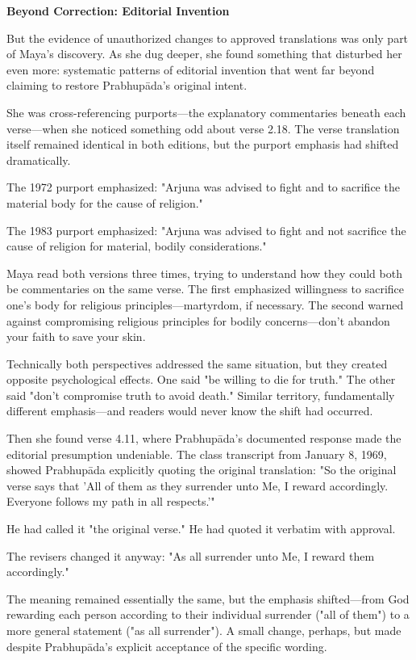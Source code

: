 \documentclass[12pt,twoside]{book}
\begin{document}
\vspace{0.5cm}
\textbf{Beyond Correction: Editorial Invention}
\vspace{0.2cm}


But the evidence of unauthorized changes to approved translations was only part of Maya's discovery. As she dug deeper, she found something that disturbed her even more: systematic patterns of editorial invention that went far beyond claiming to restore Prabhupāda's original intent.

She was cross-referencing purports—the explanatory commentaries beneath each verse—when she noticed something odd about verse 2.18. The verse translation itself remained identical in both editions, but the purport emphasis had shifted dramatically.

The 1972 purport emphasized: "Arjuna was advised to fight and to sacrifice the material body for the cause of religion."

The 1983 purport emphasized: "Arjuna was advised to fight and not sacrifice the cause of religion for material, bodily considerations."

Maya read both versions three times, trying to understand how they could both be commentaries on the same verse. The first emphasized willingness to sacrifice one's body for religious principles—martyrdom, if necessary. The second warned against compromising religious principles for bodily concerns—don't abandon your faith to save your skin.

Technically both perspectives addressed the same situation, but they created opposite psychological effects. One said "be willing to die for truth." The other said "don't compromise truth to avoid death." Similar territory, fundamentally different emphasis—and readers would never know the shift had occurred.

Then she found verse 4.11, where Prabhupāda's documented response made the editorial presumption undeniable. The class transcript from January 8, 1969, showed Prabhupāda explicitly quoting the original translation: "So the original verse says that 'All of them as they surrender unto Me, I reward accordingly. Everyone follows my path in all respects.'"

He had called it "the original verse." He had quoted it verbatim with approval.

The revisers changed it anyway: "As all surrender unto Me, I reward them accordingly."

The meaning remained essentially the same, but the emphasis shifted—from God rewarding each person according to their individual surrender ("all of them") to a more general statement ("as all surrender"). A small change, perhaps, but made despite Prabhupāda's explicit acceptance of the specific wording.
\end{document}
